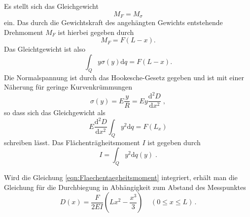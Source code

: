 Es stellt sich das Gleichgewicht
\begin{equation*}
  M_F=M_\sigma
\end{equation*}
ein. Das durch die Gewichtskraft des angehängten Gewichts entstehende Drehmoment
$M_F$ ist hierbei gegeben durch
\begin{equation*}
  M_F=F(L-x).
\end{equation*}
Das Gleichtgewicht ist also
\begin{equation}
  \int_Q y\sigma(y)\text{d}q=F(L-x).
\end{equation}
Die Normalspannung ist durch das Hookesche-Gesetz gegeben und ist mit einer Näherung
für geringe Kurvenkrümmungen
\begin{equation*}
  \sigma(y)=E\frac{y}{R}=Ey\frac{\text{d}^2D}{\text{d}x^2}\;,
\end{equation*}
so dass sich das Gleichgewicht als
\begin{equation*}
  E\frac{\text{d}^2D}{\text{d}x^2}\int_Q y^2\text{d}q=F(L_x)
\end{equation*}
schreiben lässt. Das Flächenträgheitsmoment $I$ ist gegeben durch
\begin{equation}
  I=\int_Q y^2 \text{d}q(y)\;.
  \label{eqn:Flaechentraegheitsmoment}
\end{equation}

Wird die Gleichung \eqref{eqn:Flaechentaegheitsmoment} integriert, erhält man die
Gleichung für die Durchbiegung in Abhängigkeit zum Abstand des Messpunktes
\begin{equation}
  D(x)=\frac{F}{2EI}\left(Lx^2-\frac{x^3}{3}\right)\;\;\;\;(0\le x \le L)\,.
  \label{eqn:durchbiegung1}
\end{equation}

